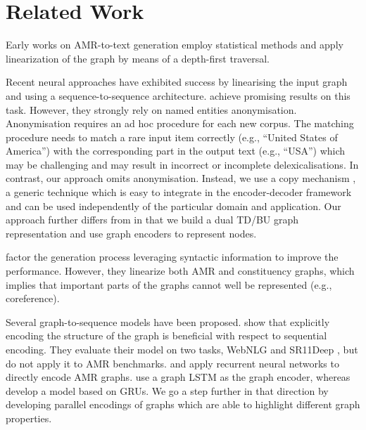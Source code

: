 \documentclass[11pt,a4paper]{article}
\begin{document}
\section{Related Work}


Early works on \mbox{AMR-to-text} generation employ statistical methods \cite{flanigan-etal-2016-generation, pourdamghani-etal-2016-generating,castro-ferreira-etal-2017-linguistic} and apply linearization of the graph by means of a depth-first traversal.

Recent neural approaches have exhibited success by linearising the input graph and using a sequence-to-sequence architecture. \citet{konsas_17} achieve promising results on this
task. However, they strongly rely on named entities anonymisation. Anonymisation requires an ad hoc procedure for each new corpus. The matching procedure needs to match a rare input item correctly (e.g., ``United States of America'') with the corresponding part in the output text (e.g., ``USA'') which may be challenging and may result in incorrect or incomplete delexicalisations. In contrast, our approach omits anonymisation. Instead, we use a copy mechanism \cite{see-etal-2017-get}, a generic technique which is easy to integrate in the encoder-decoder framework and can be used independently of the particular domain and application. Our approach further differs from \citet{konsas_17} in that we build a dual TD/BU graph representation and use graph encoders to represent nodes.

\citet{cao_naacl19} factor the generation process leveraging syntactic information to improve the performance. However, they linearize both AMR and constituency graphs, which implies that important parts of the graphs cannot well be represented (e.g., coreference).

Several \mbox{graph-to-sequence} models have been proposed. \citet{marcheggiani-icnl18} show that explicitly encoding the structure of the graph is beneficial with respect to sequential encoding. They evaluate their model on two tasks, WebNLG \cite{gardent-etal-2017-webnlg} and SR11Deep \cite{belz-etal-2011-first}, but do not apply it to AMR benchmarks. \citet{song-etal-acl2018} and \citet{beck-etal-2018-acl2018} apply recurrent neural networks to directly encode AMR graphs. \citet{song-etal-acl2018} use a graph LSTM as the graph encoder, whereas \citet{beck-etal-2018-acl2018} develop a model based on GRUs. We go a step further in that direction by developing parallel encodings of graphs which are able to highlight different graph properties.
\end{document}
